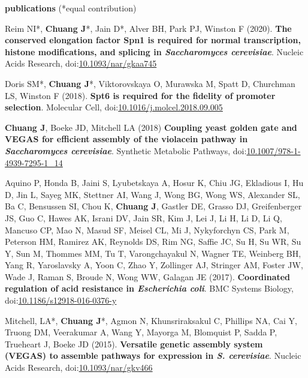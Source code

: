 \documentclass[11pt, a4paper]{article}
\begin{document}
\vspace{1em}
\textbf{\Large publications} (*equal contribution)
\begin{description}[topsep=2pt, align=right, leftmargin=!, labelwidth=\widthof{\textbf{2018}}]
    \item [2020] Reim NI*, \textbf{Chuang J}*, Jain D*, Alver BH, Park PJ, Winston F (2020). \textbf{The conserved elongation factor Spn1 is required for normal transcription, histone modifications, and splicing in \textit{Saccharomyces cerevisiae}}. Nucleic Acids Research, doi:\href{https://doi.org/10.1093/nar/gkaa745}{10.1093/nar/gkaa745}
    \item [2018] Doris SM*, \textbf{Chuang J}*, Viktorovskaya O, Murawska M, Spatt D, Churchman LS, Winston F (2018). \textbf{Spt6 is required for the fidelity of promoter selection}. Molecular Cell, doi:\href{https://doi.org/10.1016/j.molcel.2018.09.005}{10.1016/j.molcel.2018.09.005}
    \item [2018] \textbf{Chuang J}, Boeke JD, Mitchell LA (2018) \textbf{Coupling yeast golden gate and VEGAS for efficient assembly of the violacein pathway in \textit{Saccharomyces cerevisiae}}. Synthetic Metabolic Pathways, doi:\href{https://doi.org/10.1007/978-1-4939-7295-1_14}{10.1007/978-1-4939-7295-1\_14}
    \item [2017] Aquino P, Honda B, Jaini S, Lyubetskaya A, Hosur K, Chiu JG, Ekladious I, Hu D, Jin L, Sayeg MK, Stettner AI, Wang J, Wong BG, Wong WS, Alexander SL, Ba C, Bensussen SI, Chou K, \textbf{Chuang J}, Gastler DE, Grasso DJ, Greifenberger JS, Guo C, Hawes AK, Israni DV, Jain SR, Kim J, Lei J, Li H, Li D, Li Q, Mancuso CP, Mao N, Masud SF, Meisel CL, Mi J, Nykyforchyn CS, Park M, Peterson HM, Ramirez AK, Reynolds DS, Rim NG, Saffie JC, Su H, Su WR, Su Y, Sun M, Thommes MM, Tu T, Varongchayakul N, Wagner TE, Weinberg BH, Yang R, Yaroslavsky A, Yoon C, Zhao Y, Zollinger AJ, Stringer AM, Foster JW, Wade J, Raman S, Broude N, Wong WW, Galagan JE (2017). \textbf{Coordinated regulation of acid resistance in \textit{Escherichia coli}}. BMC Systems Biology, doi:\href{https://doi.org/10.1186/s12918-016-0376-y}{10.1186/s12918-016-0376-y}
    \item [2015] Mitchell, LA*, \textbf{Chuang J}*, Agmon N, Khunsriraksakul C, Phillips NA, Cai Y, Truong DM, Veerakumar A, Wang Y, Mayorga M, Blomquist P, Sadda P, Trueheart J, Boeke JD (2015). \textbf{Versatile genetic assembly system (VEGAS) to assemble pathways for expression in \textit{S. cerevisiae}}. Nucleic Acids Research, doi:\href{https://doi.org/10.1093/nar/gkv466}{10.1093/nar/gkv466}

\end{description}
\end{document}
